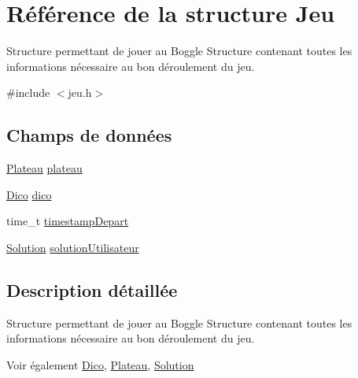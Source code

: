 \hypertarget{structJeu}{
\section{Référence de la structure Jeu}
\label{structJeu}
}


Structure permettant de jouer au Boggle Structure contenant toutes les informations nécessaire au bon déroulement du jeu.  




{\ttfamily \#include $<$jeu.h$>$}

\subsection*{Champs de données}
\begin{DoxyCompactItemize}
\item 
\hyperlink{structPlateau}{Plateau} \hyperlink{structJeu_af2931c71f6de940ec7ed3fcd2f9d7158}{plateau}
\item 
\hyperlink{structDico}{Dico} \hyperlink{structJeu_a6bda384c6fca4e83ae15ac69f2228a41}{dico}
\item 
time\_\-t \hyperlink{structJeu_af48a5fddf1dc40b7c4a85918d73f201d}{timestampDepart}
\item 
\hyperlink{structSolution}{Solution} \hyperlink{structJeu_ae8e1dca71285915404d1de4ff609a1d6}{solutionUtilisateur}
\end{DoxyCompactItemize}


\subsection{Description détaillée}
Structure permettant de jouer au Boggle Structure contenant toutes les informations nécessaire au bon déroulement du jeu. \begin{DoxySeeAlso}{Voir également}
\hyperlink{structDico}{Dico}, \hyperlink{structPlateau}{Plateau}, \hyperlink{structSolution}{Solution} 
\end{DoxySeeAlso}


